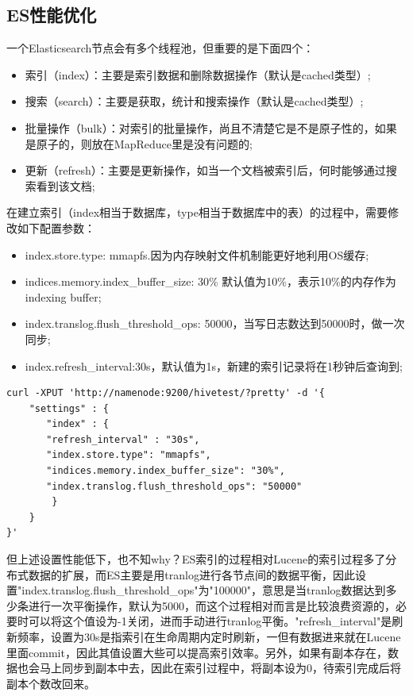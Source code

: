 \subsection{ES性能优化}
\par 一个Elasticsearch节点会有多个线程池，但重要的是下面四个：
\begin{itemize}
\item 索引（index）：主要是索引数据和删除数据操作（默认是cached类型）;
\item 搜索（search）：主要是获取，统计和搜索操作（默认是cached类型）;
\item 批量操作（bulk）：对索引的批量操作，尚且不清楚它是不是原子性的，如果是原子的，则放在MapReduce里是没有问题的;
\item 更新（refresh）：主要是更新操作，如当一个文档被索引后，何时能够通过搜索看到该文档;
\end{itemize}
\par 在建立索引（index相当于数据库，type相当于数据库中的表）的过程中，需要修改如下配置参数：
\begin{itemize}
\item index.store.type: mmapfs.因为内存映射文件机制能更好地利用OS缓存;
\item indices.memory.index\_buffer\_size: 30\% 默认值为10\%，表示10\%的内存作为indexing buffer;
\item index.translog.flush\_threshold\_ops: 50000，当写日志数达到50000时，做一次同步;
\item index.refresh\_interval:30s，默认值为1s，新建的索引记录将在1秒钟后查询到;
\end{itemize}
\begin{verbatim}
curl -XPUT 'http://namenode:9200/hivetest/?pretty' -d '{
    "settings" : {
       "index" : {
       "refresh_interval" : "30s",
       "index.store.type": "mmapfs",
       "indices.memory.index_buffer_size": "30%",
       "index.translog.flush_threshold_ops": "50000"
        }
    }
}'
\end{verbatim}
\par 但上述设置性能低下，也不知why？ES索引的过程相对Lucene的索引过程多了分布式数据的扩展，而ES主要是用tranlog进行各节点间的数据平衡，因此设置"index.translog.flush\_threshold\_ops"为"100000"，意思是当tranlog数据达到多少条进行一次平衡操作，默认为5000，而这个过程相对而言是比较浪费资源的，必要时可以将这个值设为-1关闭，进而手动进行tranlog平衡。"refresh\_interval"是刷新频率，设置为30s是指索引在生命周期内定时刷新，一但有数据进来就在Lucene里面commit，因此其值设置大些可以提高索引效率。另外，如果有副本存在，数据也会马上同步到副本中去，因此在索引过程中，将副本设为0，待索引完成后将副本个数改回来。
